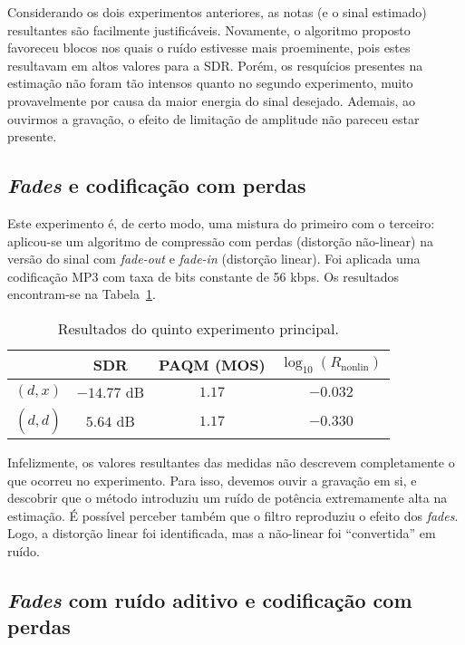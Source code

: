 Considerando os dois experimentos anteriores, as notas (e o sinal estimado) resultantes
são facilmente justificáveis. Novamente, o algoritmo proposto favoreceu blocos nos
quais o ruído estivesse mais proeminente, pois estes resultavam em altos valores para a
SDR. Porém, os resquícios presentes na estimação não foram tão intensos quanto no
segundo experimento, muito provavelmente por causa da maior energia do sinal desejado.
Ademais, ao ouvirmos a gravação, o efeito de limitação de amplitude não pareceu estar
presente.

\subsection{\textit{Fades} e codificação com perdas}

Este experimento é, de certo modo, uma mistura do primeiro com o terceiro: aplicou-se
um algoritmo de compressão com perdas (distorção não-linear) na versão do sinal com
\textit{fade-out} e \textit{fade-in} (distorção linear). Foi aplicada uma codificação
MP3 com taxa de bits constante de 56 kbps. Os resultados encontram-se na
Tabela~\ref{tab:correntropy:experiment-5}. {\def\arraystretch{1.25}\tabcolsep=10pt
\begin{table}[!ht]
	\centering
	\caption[Resultados do quinto experimento: \textit{fades} e codificação com perdas]{Resultados do quinto experimento principal.}
	\label{tab:correntropy:experiment-5}
	\begin{tabular}{cccc}
		\toprule
		               & SDR         & PAQM (MOS) & $\log_{10}(R_{\text{nonlin}})$ \\
		\midrule
		$(d, x)$       & $-14.77$ dB & $1.17$     & $-0.032$                       \\
		$(d, \hat{d})$ & $5.64$ dB   & $1.17$     & $-0.330$                       \\ \bottomrule
	\end{tabular}
\end{table}
}

Infelizmente, os valores resultantes das medidas não descrevem completamente o que
ocorreu no experimento. Para isso, devemos ouvir a gravação em si, e descobrir que o
método introduziu um ruído de potência extremamente alta na estimação. É possível
perceber também que o filtro reproduziu o efeito dos \textit{fades}. Logo, a distorção
linear foi identificada, mas a não-linear foi ``convertida'' em ruído.

\subsection{\textit{Fades} com ruído aditivo e codificação com perdas}

